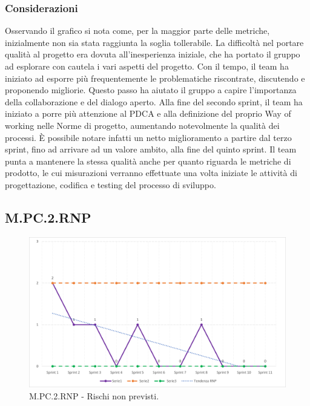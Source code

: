 \documentclass[10pt, a4paper]{article}
\begin{document}
\subsubsection{Considerazioni}
Osservando il grafico si nota come, per la maggior parte delle metriche, inizialmente non sia stata raggiunta la soglia tollerabile.
La difficoltà nel portare qualità al progetto era dovuta all’inesperienza iniziale, che ha portato il gruppo ad esplorare con cautela i vari aspetti del progetto.
Con il tempo, il team ha iniziato ad esporre più frequentemente le problematiche riscontrate, discutendo e proponendo migliorie.
Questo passo ha aiutato il gruppo a capire l’importanza della collaborazione e del dialogo aperto.
Alla fine del secondo sprint, il team ha iniziato a porre più attenzione al PDCA e alla definizione del proprio Way of working nelle Norme di progetto, aumentando notevolmente la qualità dei processi.
È possibile notare infatti un netto miglioramento a partire dal terzo sprint, fino ad arrivare ad un valore ambito, alla fine del quinto sprint. 
Il team punta a mantenere la stessa qualità anche per quanto riguarda le metriche di prodotto, le cui misurazioni verranno effettuate una volta iniziate le attività di progettazione, codifica e testing del processo di sviluppo.
\subsection{M.PC.2.RNP}
\begin{figure}[H]
\includegraphics[width=15.5cm]{img/metriche/MPC2RNP.png}
\caption{M.PC.2.RNP - Rischi non previsti.}
\end{figure}
\end{document}

